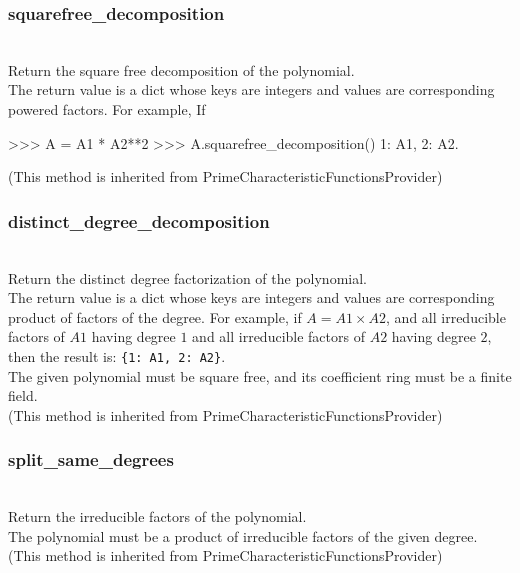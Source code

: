   \subsubsection{squarefree\_decomposition}
  \\
  \spacing
  \quad Return the square free decomposition of the polynomial.\\
  \spacing
  \quad The return value is a dict whose keys are integers and values are
  corresponding powered factors.  For example, If
\begin{ex}
>>> A = A1 * A2**2
>>> A.squarefree_decomposition()
{1: A1, 2: A2}.
\end{ex}%
  (This method is inherited from PrimeCharacteristicFunctionsProvider)

  \subsubsection{distinct\_degree\_decomposition}
  \\
  \spacing
  \quad Return the distinct degree factorization of the polynomial.\\
  \spacing
  \quad The return value is a dict whose keys are integers and values are
  corresponding product of factors of the degree. For example, if
  \(A = A1 \times A2\), and all irreducible factors of \(A1\) having
  degree \(1\) and all irreducible factors of \(A2\) having degree \(2\),
  then the result is: {\tt \{1: A1, 2: A2\}}.\\

  \quad The given polynomial must be square free, and its coefficient
  ring must be a finite field.\\
  (This method is inherited from PrimeCharacteristicFunctionsProvider)

  \subsubsection{split\_same\_degrees}
  \\
  \spacing
  \quad Return the irreducible factors of the polynomial.\\
  \spacing
  \quad The polynomial must be a product of irreducible factors of
  the given degree.\\
  (This method is inherited from PrimeCharacteristicFunctionsProvider)


